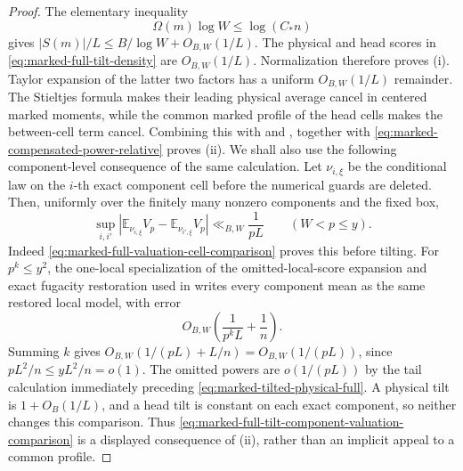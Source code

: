 \documentclass[11pt]{article}
\numberwithin{equation}{section}
\theoremstyle{definition}
\theoremstyle{remark}
\newcommand{\1}{\mathbf 1}
\begin{document}
\begin{proof}
The elementary inequality
\[
 \Omega(m)\log W\leq\log(C_*n)
\]
gives \(|S(m)|/L\leq B/\log W+O_{B,W}(1/L)\).  The physical and head scores
in \eqref{eq:marked-full-tilt-density} are \(O_{B,W}(1/L)\).
Normalization therefore proves (i).  Taylor expansion of the latter
two factors has a uniform \(O_{B,W}(1/L)\) remainder.  The Stieltjes
formula makes their leading physical average cancel in centered marked
moments, while the common marked profile of the head cells makes the
between-cell term cancel.  Combining this with
  and
 , together with
 \eqref{eq:marked-compensated-power-relative} proves (ii).
We shall also use the following component-level consequence of the same
calculation.  Let \(\nu_{i,\xi}\) be the conditional law on the \(i\)-th
exact component cell before the numerical guards are deleted.  Then,
uniformly over the finitely many nonzero components and the fixed box,
\begin{equation}
 \sup_{i,i'}\left|
  \mathbb E_{\nu_{i,\xi}}V_p-\mathbb E_{\nu_{i',\xi}}V_p
 \right|\ll_{B,W}\frac1{pL}
 \qquad(W<p\leq y).
 \label{eq:marked-full-tilt-component-valuation-comparison}
\end{equation}
Indeed \eqref{eq:marked-full-valuation-cell-comparison} proves this before
tilting.  For \(p^k\leq y^2\), the one-local specialization of the
omitted-local-score expansion and exact fugacity restoration used in
 writes every component
mean as the same restored local model, with error
\[
 O_{B,W}\!\left(\frac1{p^kL}+\frac1n\right).
\]
Summing \(k\) gives \(O_{B,W}(1/(pL)+L/n)=O_{B,W}(1/(pL))\), since
\(pL^2/n\leq yL^2/n=o(1)\).  The omitted powers are
\(o(1/(pL))\) by the tail calculation immediately preceding
\eqref{eq:marked-tilted-physical-full}.  A physical tilt is
\(1+O_B(1/L)\), and a head tilt is constant on each exact component, so
neither changes this comparison.  Thus
\eqref{eq:marked-full-tilt-component-valuation-comparison} is a displayed
consequence of (ii), rather than an implicit appeal to a common profile.


\end{proof}
\end{document}
